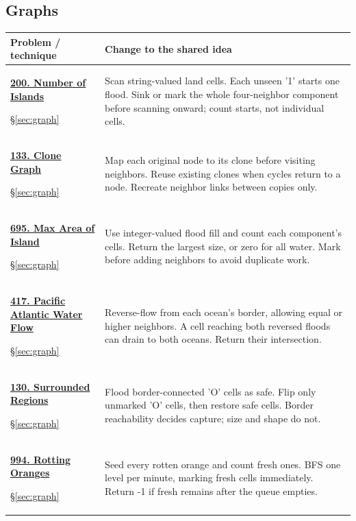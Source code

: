 \documentclass[11pt]{article}
\newcommand{\sect}[1]{\hyperref[sec:#1]{\S\ref*{sec:#1}}}
\begin{document}
\subsection{Graphs}
\begin{longtable}{@{}L{4.3cm}L{11.7cm}@{}}
\toprule Problem / technique & Change to the shared idea \\ \midrule\endhead
\hypertarget{lc200}{}\href{https://leetcode.com/problems/number-of-islands/}{\textbf{200. Number of Islands}}\par\sect{graph} & Scan string-valued land cells. Each unseen '1' starts one flood. Sink or mark the whole four-neighbor component before scanning onward; count starts, not individual cells.\\[4pt]
\hypertarget{lc133}{}\href{https://leetcode.com/problems/clone-graph/}{\textbf{133. Clone Graph}}\par\sect{graph} & Map each original node to its clone before visiting neighbors. Reuse existing clones when cycles return to a node. Recreate neighbor links between copies only.\\[4pt]
\hypertarget{lc695}{}\href{https://leetcode.com/problems/max-area-of-island/}{\textbf{695. Max Area of Island}}\par\sect{graph} & Use integer-valued flood fill and count each component's cells. Return the largest size, or zero for all water. Mark before adding neighbors to avoid duplicate work.\\[4pt]
\hypertarget{lc417}{}\href{https://leetcode.com/problems/pacific-atlantic-water-flow/}{\textbf{417. Pacific Atlantic Water Flow}}\par\sect{graph} & Reverse-flow from each ocean's border, allowing equal or higher neighbors. A cell reaching both reversed floods can drain to both oceans. Return their intersection.\\[4pt]
\hypertarget{lc130}{}\href{https://leetcode.com/problems/surrounded-regions/}{\textbf{130. Surrounded Regions}}\par\sect{graph} & Flood border-connected 'O' cells as safe. Flip only unmarked 'O' cells, then restore safe cells. Border reachability decides capture; size and shape do not.\\[4pt]
\hypertarget{lc994}{}\href{https://leetcode.com/problems/rotting-oranges/}{\textbf{994. Rotting Oranges}}\par\sect{graph} & Seed every rotten orange and count fresh ones. BFS one level per minute, marking fresh cells immediately. Return -1 if fresh remains after the queue empties.\\[4pt]

\end{longtable}
\end{document}
